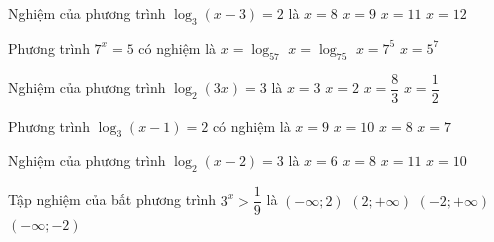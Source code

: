\begin{ex}%
	Nghiệm của phương trình  $\log_3(x-3)=2$ là
	 \choice
		 {$x=8$}
		 {$x=9$}
		 {$x=11$}
		{\True  $x=12$}
\end{ex}

\begin{ex}%
	Phương trình  $7^x=5$ có nghiệm là
	 \choice
		{$x=\log_57$} 
		{\True  $x=\log_75$}
		{$x=7^5$} 
		 {$x=5^7$}
\end{ex}

\begin{ex}%
	Nghiệm của  phương trình $\log_2\left(3x\right)=3$ là
	 \choice
		 {$x=3$}
		{$x=2$} 
		{\True  $x=\dfrac{8}{3}$}
		 {$x=\dfrac{1}{2}$}
\end{ex}

\begin{ex}%
	Phương  trình $\log_3(x-1)=2$ có nghiệm là
	\choice 
		 {$x=9$}
		 {\True $x=10$}
		 {$x=8$}
		{$x=7$} 
\end{ex}

\begin{ex}%
	Nghiệm của phương trình $\log_2  \left(x-2\right)=3$ là
	 \choice
		 {$x=6$}
		{$x=8$} 
		 {$x=11$}
		{\True  $x=10$}
\end{ex}

\begin{ex}%
	 Tập nghiệm của bất phương trình $3^x>\dfrac{1}{9}$ là
	 \choice
		 {$(-\infty;2)$}
		 {$(2;+\infty)$}
		{\True  $(-2;+\infty)$}
		 {$(-\infty;-2)$}
\end{ex}

